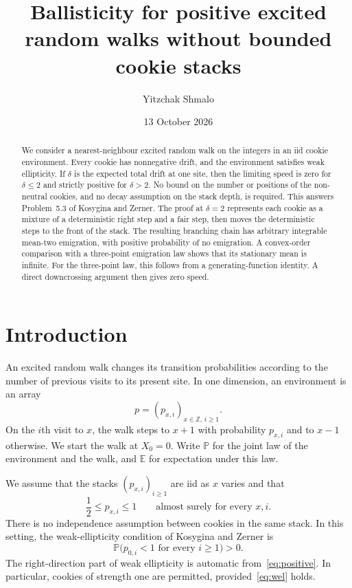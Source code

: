 \documentclass[11pt]{amsart}
\title[Ballisticity without bounded cookie stacks]{Ballisticity for positive excited random walks without bounded cookie stacks}
\author{Yitzchak Shmalo}
\date{13 October 2026}
\numberwithin{equation}{section}
\theoremstyle{remark}
\newcommand{\E}{\mathbb E}
\newcommand{\Pp}{\mathbb P}
\newcommand{\Z}{\mathbb Z}
\begin{document}
\begin{abstract}
We consider a nearest-neighbour excited random walk on the integers in an iid cookie environment. Every cookie has nonnegative drift, and the environment satisfies weak ellipticity. If $\delta$ is the expected total drift at one site, then the limiting speed is zero for $\delta\le2$ and strictly positive for $\delta>2$. No bound on the number or positions of the non-neutral cookies, and no decay assumption on the stack depth, is required. This answers Problem~5.3 of Kosygina and Zerner. The proof at $\delta=2$ represents each cookie as a mixture of a deterministic right step and a fair step, then moves the deterministic steps to the front of the stack. The resulting branching chain has arbitrary integrable mean-two emigration, with positive probability of no emigration. A convex-order comparison with a three-point emigration law shows that its stationary mean is infinite. For the three-point law, this follows from a generating-function identity. A direct downcrossing argument then gives zero speed.
\end{abstract}
\maketitle

\section{Introduction}\label{sec:intro}

An excited random walk changes its transition probabilities according to the number of previous visits to its present site. In one dimension, an environment is an array
\[
 p=(p_{x,i})_{x\in\Z,\,i\ge1}.
\]
On the $i$th visit to $x$, the walk steps to $x+1$ with probability $p_{x,i}$ and to $x-1$ otherwise. We start the walk at $X_0=0$. Write $\Pp$ for the joint law of the environment and the walk, and $\E$ for expectation under this law.

We assume that the stacks $(p_{x,i})_{i\ge1}$ are iid as $x$ varies and that
\begin{equation}\label{eq:positive}
 \frac12\le p_{x,i}\le1\qquad\text{almost surely for every }x,i.
\end{equation}
There is no independence assumption between cookies in the same stack. In this setting, the weak-ellipticity condition of Kosygina and Zerner is
\begin{equation}\label{eq:wel}
 \Pp\bigl(p_{0,i}<1\text{ for every }i\ge1\bigr)>0.
\end{equation}
The right-direction part of weak ellipticity is automatic from~\eqref{eq:positive}. In particular, cookies of strength one are permitted, provided~\eqref{eq:wel} holds.
\end{document}
